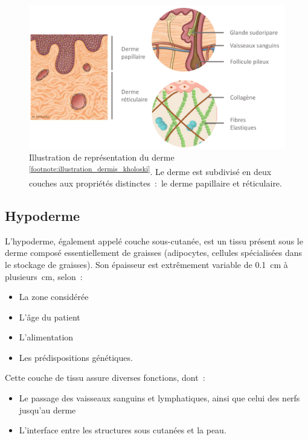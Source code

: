 \begin{figure}[H]
    \centering
    \includegraphics[width=\linewidth]{contents/chapter_1/resources/illustration_dermis_kholoski.pdf}
    \caption{Illustration de représentation du derme \textsuperscript{\ref{footnote:illustration_dermis_kholoski}}. Le derme est subdivisé en deux couches aux propriétés distinctes~:~le derme papillaire et réticulaire.}
    \label{fig:illustration_dermis_kholoski}
\end{figure}\par

\addtocounter{footnote}{1}
\clearpage

\subsection{Hypoderme}
L’hypoderme, également appelé couche sous-cutanée, est un tissu présent sous le derme composé essentiellement de graisses (adipocytes, cellules spécialisées dans le stockage de graisses). Son épaisseur est extrêmement variable de \SI{0,1}{\centi\metre} à \SI[parse-numbers = false]{plusieurs}{\centi\metre}, selon~:
\begin{itemize}
\item La zone considérée
\item L’âge du patient
\item L’alimentation
\item Les prédispositions génétiques.
\end{itemize}\par

Cette couche de tissu assure diverses fonctions, dont~:
\begin{itemize}
\item Le passage des vaisseaux sanguins et lymphatiques, ainsi que celui des nerfs jusqu’au derme
\item L’interface entre les structures sous cutanées et la peau.
\end{itemize}\par


